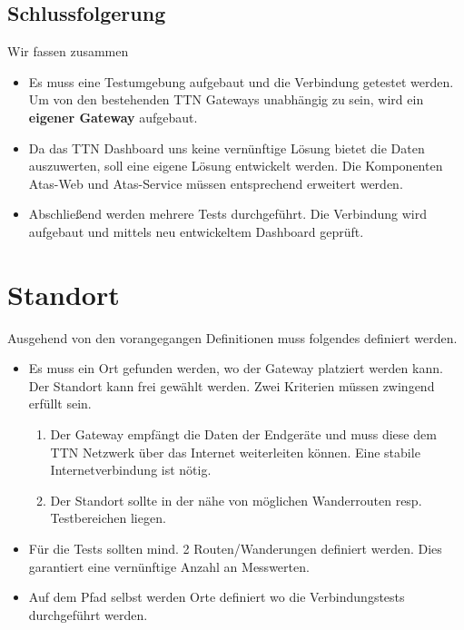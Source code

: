 \documentclass[11pt,english,german]{report}
\theoremstyle{definition}
\begin{document}
\subsection{Schlussfolgerung}
Wir fassen zusammen
\begin{itemize}
	\item
	Es muss eine Testumgebung aufgebaut und die Verbindung getestet werden. Um von den bestehenden TTN Gateways unabhängig zu sein, wird ein \textbf{eigener Gateway} aufgebaut.
	\item 
	Da das TTN Dashboard uns keine vernünftige Lösung bietet die Daten auszuwerten, soll eine eigene Lösung entwickelt werden. Die Komponenten Atas-Web und Atas-Service müssen entsprechend erweitert werden.
	\item Abschließend werden mehrere Tests durchgeführt. Die Verbindung wird aufgebaut und mittels neu entwickeltem Dashboard geprüft.
\end{itemize}

\newpage
\section{Standort}
Ausgehend von den vorangegangen Definitionen muss folgendes definiert werden.
\begin{itemize}
	\item Es muss ein Ort gefunden werden, wo der Gateway platziert werden kann.\\[0.3cm]
	Der Standort kann frei gewählt werden. Zwei Kriterien müssen zwingend erfüllt sein. 
	\begin{enumerate}
		\item
		Der Gateway empfängt die Daten der Endgeräte und muss diese dem TTN Netzwerk über das Internet weiterleiten können. Eine stabile Internetverbindung ist nötig. 
		\item 
		Der Standort sollte in der nähe von möglichen Wanderrouten resp. Testbereichen liegen.
	\end{enumerate}
	\item Für die Tests sollten mind. 2 Routen/Wanderungen definiert werden. Dies garantiert eine vernünftige Anzahl an Messwerten.
	\item Auf dem Pfad selbst werden Orte definiert wo die Verbindungstests durchgeführt werden.
\end{itemize}

\newpage
\end{document}
